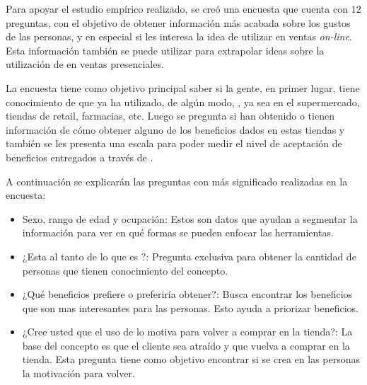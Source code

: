 Para apoyar el estudio empírico realizado, se creó una encuesta que cuenta con $12$ preguntas, con el
objetivo de obtener información más acabada sobre los gustos de las personas, y en especial
si les interesa la idea de utilizar {\gam} en ventas \emph{on-line}. Esta información
también se puede utilizar para extrapolar ideas sobre la utilización de {\gam} en
ventas presenciales.

La encuesta tiene como objetivo principal saber si la gente, en primer lugar, tiene conocimiento
de que ya ha utilizado, de algún modo, {\gam}, ya sea en el supermercado, tiendas de retail,
farmacias, etc. Luego se pregunta si han obtenido o tienen información de cómo obtener alguno
de los beneficios dados en estas tiendas y también se les presenta una escala para poder medir
el nivel de aceptación de beneficios entregados a través de {\gam}.

A continuación se explicarán las preguntas con más significado realizadas en la encuesta:
\begin{itemize}
\item Sexo, rango de edad y ocupación: Estos son datos que ayudan a segmentar
la información para ver en qué formas se pueden enfocar las herramientas.
\item ¿Esta al tanto de lo que es {\gam}?: Pregunta exclusiva para obtener la cantidad de
personas que tienen conocimiento del concepto.
\item ¿Qué beneficios prefiere o preferiría obtener?: Busca encontrar los beneficios que son
 mas interesantes para las personas. Esto ayuda a priorizar beneficios.
\item ¿Cree usted que el uso de {\gam} lo motiva para volver a comprar en la tienda?: La
base del concepto es que el cliente sea atraído y que vuelva a comprar en la tienda. Esta pregunta
tiene como objetivo encontrar si se crea en las personas la motivación para volver.
\end{itemize}

